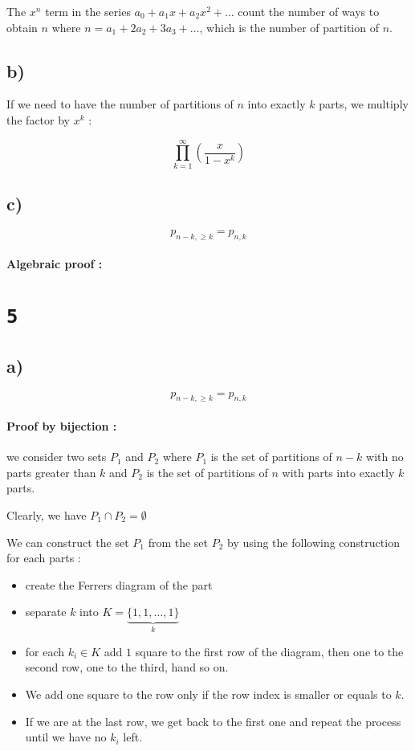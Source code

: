 \documentclass[a4paper,11pt]{report}
\begin{document}
The $x^n$ term in the series $a_0 + a_1x + a_2x^2 + \dots$ count the number of
ways to obtain $n$ where $n = a_1 + 2 a_2 + 3 a_3 + \dots$, which is the number
of partition of $n$.

\subsection*{b)}

If we need to have the number of partitions of $n$ into exactly $k$ parts, we
multiply the factor by $x^k$ :

\[
  \prod_{k=1}^\infty (\frac{x}{1 - x^k})
\]

\subsection*{c)}

\[
  p_{n-k,\geq k} = p_{n,k}
\]

\paragraph{Algebraic proof : }



\section*{\texttt{5}}

\subsection*{a)}

\[
  p_{n-k,\geq k} = p_{n,k}
\]

\paragraph{Proof by bijection : } we consider two sets $P_1$ and $P_2$ where
$P_1$ is the set of partitions of $n-k$ with no parts greater than $k$ and $P_2$
is the set of partitions of $n$ with parts into exactly $k$ parts.

Clearly, we have $P_1 \cap P_2 = \emptyset$

We can construct the set $P_1$ from the set $P_2$ by using the following
construction for each parts :

\begin{itemize}
\item create the Ferrers diagram of the part
\item separate $k$ into $K =  \underbrace{\{1,1,\dots,1\}}_{k}$
\item for each $k_i \in K$ add $1$ square to the first row of the diagram, then
  one to the second row, one to the third, hand so on.
\item We add one square to the row only if the row index is smaller or equals to
  $k$.
\item If we are at the last row, we get back to the first one and repeat the
  process until we have no $k_i$ left.
\end{itemize}
\end{document}
